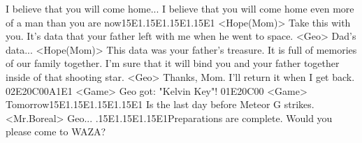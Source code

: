 I believe that you will come home... 
I believe that you will come home even more of a man than you are now{15}{E1}.{15}{E1}.{15}{E1}.{15}{E1} 
<Hope(Mom)> Take this with you. 
It's data that your father left with me when he went to space. 
<Geo> Dad's data... 
<Hope(Mom)> This data was your father's treasure. 
It is full of memories of our family together. 
I'm sure that it will bind you and your father together inside of that shooting star. 
<Geo> Thanks, Mom. 
I'll return it when I get back. 
{02}{E2}{0C}{00}{A1}{E1} 
<Game> Geo got: "Kelvin Key"! 
{01}{E2}{0C}{00}
<Game> Tomorrow{15}{E1}.{15}{E1}.{15}{E1}.{15}{E1} 
Is the last day before Meteor G strikes. 
<Mr.Boreal> Geo... .{15}{E1}.{15}{E1}.{15}{E1}Preparations are complete. 
Would you please come to WAZA? 
